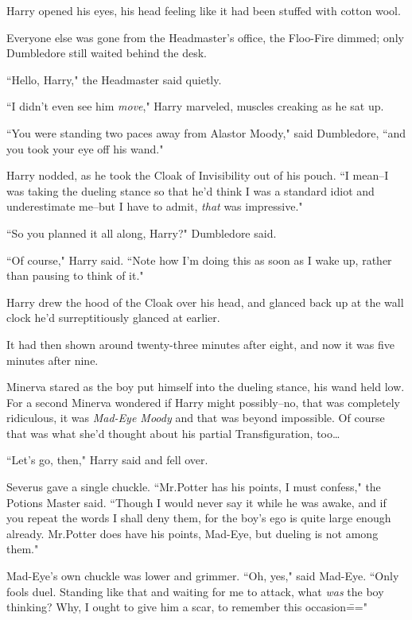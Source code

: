 \later

Harry opened his eyes, his head feeling like it had been stuffed with cotton wool.

Everyone else was gone from the Headmaster's office, the Floo-Fire dimmed; only Dumbledore still waited behind the desk.

``Hello, Harry," the Headmaster said quietly.

``I didn't even see him \emph{move}," Harry marveled, muscles creaking as he sat up.

``You were standing two paces away from Alastor Moody," said Dumbledore, ``and you took your eye off his wand."

Harry nodded, as he took the Cloak of Invisibility out of his pouch. ``I mean\---I was taking the dueling stance so that he'd think I was a standard idiot and underestimate me\---but I have to admit, \emph{that} was impressive."

``So you planned it all along, Harry?" Dumbledore said.

``Of course," Harry said. ``Note how I'm doing this as soon as I wake up, rather than pausing to think of it."

Harry drew the hood of the Cloak over his head, and glanced back up at the wall clock he'd surreptitiously glanced at earlier.

It had then shown around twenty-three minutes after eight, and now it was five minutes after nine.

\later

Minerva stared as the boy put himself into the dueling stance, his wand held low. For a second Minerva wondered if Harry might possibly\---no, that was completely ridiculous, it was \emph{Mad-Eye Moody} and that was beyond impossible. Of course that was what she'd thought about his partial Transfiguration, too{\ldots}

``Let's go, then," Harry said and fell over.

Severus gave a single chuckle. ``Mr.\?Potter has his points, I must confess," the Potions Master said. ``Though I would never say it while he was awake, and if you repeat the words I shall deny them, for the boy's ego is quite large enough already. Mr.\?Potter does have his points, Mad-Eye, but dueling is not among them."

Mad-Eye's own chuckle was lower and grimmer. ``Oh, yes," said Mad-Eye. ``Only fools duel. Standing like that and waiting for me to attack, what \emph{was} the boy thinking? Why, I ought to give him a scar, to remember this occasion\==="


